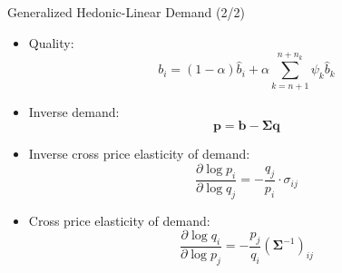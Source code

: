 \documentclass[
  10pt,               %
  aspectratio=169,     %
]{beamer}
\theoremstyle{plain}
\begin{document}
\begin{frame}{Generalized Hedonic-Linear Demand \citep{Pellegrino2024-dn} (2/2)}
  \begin{itemize}
    \item Quality:
          \[
            b_{i}=\left(1-\alpha\right)\hat{b}_{i}+\alpha\sum_{k=n+1}^{n+n_{k}}\psi_{k}\hat{b}_{k}
          \]
    \item Inverse demand:
          \[
            \bm{p}=\bm{b}-\bm{\Sigma}\bm{q}
          \]
    \item Inverse cross price elasticity of demand:
          \[
            \frac{\partial\log p_{i}}{\partial\log q_{j}}=-\frac{q_{j}}{p_{i}}\cdot\sigma_{ij}
          \]
    \item Cross price elasticity of demand:
          \[
            \frac{\partial\log q_{i}}{\partial\log p_{j}}=-\frac{p_{j}}{q_{i}}(\bm{\Sigma}^{-1})_{ij}
          \]
  \end{itemize}
\end{frame}
\end{document}
